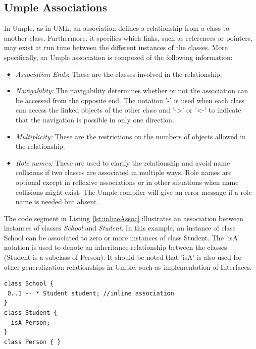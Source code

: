 \subsection{Umple Associations}
\label{subsection:associations}
In Umple, as in UML, an association defines a relationship from a class to another class. Furthermore, it specifies which links, such as references or pointers, may exist at run time between the different instances of the classes.
More specifically, an Umple association is composed of the following information:

\begin{itemize}

\item \textit{Association Ends}: These are the classes involved in the relationship.

\item \textit{Navigability:} The navigability determines whether or not the association can be accessed from the opposite end. The notation '\--' is used when each class can access the linked objects of the other class and '-\textgreater{}' or '\textless{}-' to indicate that the navigation is possible in only one direction.

\item \textit{Multiplicity:} These are the restrictions on the numbers of objects allowed in the relationship.

\item \textit{Role names:} These are used to clarify the relationship and avoid name collisions if two classes are associated in multiple ways. Role names are optional except in reflexive associations or in other situations when name collisions might exist. The Umple compiler will give an error message if a role name is needed but absent.
\end{itemize}

The code segment in Listing \ref{lst:inlineAssoc} illustrates an association between instances of classes \emph{School} and \emph{Student}. In this example, an instance of class School can be associated to zero or more instances of class Student. The 'isA' notation is used to denote an inheritance relationship between the classes (Student is a subclass of Person). It should be noted that 'isA' is also used for other generalization relationships in Umple, such as implementation of Interfaces.

\begin{lstlisting}[style=umplePlain, caption=An example of an inline Umple association, label=lst:inlineAssoc]
class School {
 0..1 -- * Student student; //inline association
}
class Student {
  isA Person;
}
class Person { }
\end{lstlisting}

